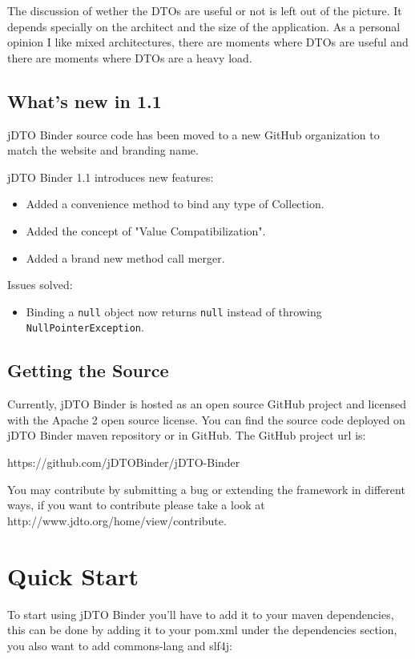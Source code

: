 \documentclass[11pt]{article}
\newcommand{\JDTO}{jDTO Binder\xspace}
\newcommand{\JDV}{1.1\xspace}
\begin{document}
The discussion of wether the DTOs are useful or not is left out of the picture. It depends specially on 
the architect and the size of the application. As a personal opinion I like mixed architectures, there are
moments where DTOs are useful and there are moments where DTOs are a heavy load.

\subsection{What's new in \JDV}

\JDTO source code has been moved to a new GitHub organization to match the website and branding name.

\JDTO \JDV introduces new features:
\begin{itemize}
\item Added a convenience method to bind any type of Collection.
\item Added the concept of "Value Compatibilization".
\item Added a brand new method call merger.
\end{itemize}

Issues solved:

\begin{itemize}
\item Binding a \texttt{null} object now returns \texttt{null} instead of throwing \texttt{NullPointerException}.
\end{itemize}

\subsection{Getting the Source}

Currently, \JDTO is hosted as an open source GitHub project and licensed with the Apache 2 open source license. You can find the source code deployed on \JDTO maven repository or in GitHub. The GitHub project url is: 

https://github.com/jDTOBinder/jDTO-Binder

You may contribute by submitting a bug or extending the framework in different ways, if you want to contribute please take a look at http://www.jdto.org/home/view/contribute.

\section{Quick Start}


To start using \JDTO you'll have to add it to your maven dependencies, this can be done
by adding it to your pom.xml under the dependencies section, you also want to add commons-lang and slf4j:
\end{document}
